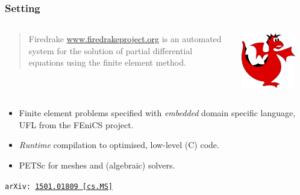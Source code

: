 \documentclass[presentation,aspectratio=43, 10pt]{beamer}
\newcommand{\arxivlink}[2]{{\texttt{arXiv:\,\href{https://arxiv.org/abs/#1}{#1\,[#2]}}}}
\begin{document}
\begin{frame}[t]
  \frametitle{Setting}

  \begin{columns}
    \begin{column}{0.8\textwidth}
      \begin{quote}
        Firedrake \url{www.firedrakeproject.org} {\normalfont
          [\ldots]} is an automated system for the solution of
        partial differential equations using the finite element
        method.
      \end{quote}
    \end{column}
    \begin{column}{0.2\textwidth}
      \includegraphics[width=0.8\textwidth]{firedrake-small}
    \end{column}
  \end{columns}
  \begin{itemize}
  \item Finite element problems specified with \emph{embedded}
    domain specific language, UFL \parencite{Alnaes:2014} from the
    FEniCS project.
  \item \emph{Runtime} compilation to optimised, low-level (C)
    code.
  \item PETSc for meshes and (algebraic) solvers.
  \end{itemize}

  \begin{flushright}
    {\scriptsize \textcite{Rathgeber:2016} \arxivlink{1501.01809}{cs.MS}}
  \end{flushright}
\end{frame}
\end{document}
